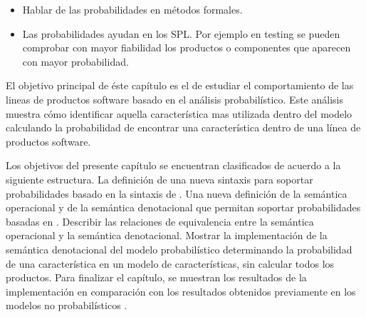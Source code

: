 \begin{itemize}
\item Hablar de las probabilidades en métodos formales.
\item Las probabilidades ayudan en los SPL. Por ejemplo en testing
  se pueden comprobar con mayor fiabilidad los productos o componentes
  que aparecen con mayor probabilidad.
\end{itemize}

El objetivo principal de éste capítulo es el de
estudiar el comportamiento de las lineas de productos
software basado en el análisis probabilístico.
Este análisis muestra cómo identificar aquella
característica mas utilizada dentro del modelo 
calculando la probabilidad de encontrar
una característica dentro de una línea de productos software.

Los objetivos del presente capítulo se encuentran
clasificados de acuerdo a la siguiente estructura.
La definición de una nueva sintaxis para soportar
probabilidades basado en la sintaxis de \fodaPA.
Una nueva definición de la semántica operacional
y de la semántica denotacional que permitan
soportar probabilidades basadas en \fodaPA.
Describir las relaciones de equivalencia entre
la semántica operacional y la semántica denotacional.
Mostrar la implementación de la semántica
denotacional del modelo probabilístico determinando
la probabilidad de una característica en un modelo
de características,
sin calcular todos los productos.
Para finalizar el capítulo, se muestran los resultados
de la implementación en comparación
con los resultados obtenidos previamente en
los modelos no probabilísticos \cite{acl13, clc16}.




  

